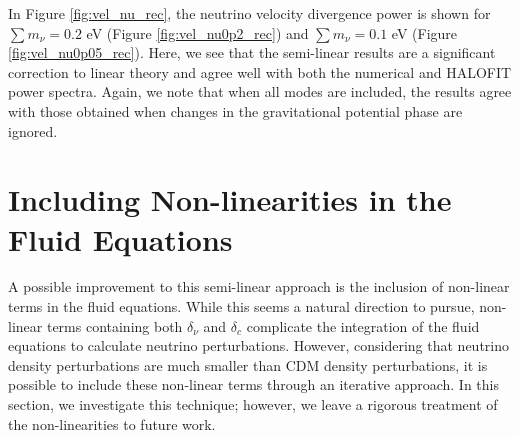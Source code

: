 \documentclass[twocolumn,superscriptaddress,prd]{revtex4}
\newcommand{\halofit}{HALOFIT }
\begin{document}
In Figure \ref{fig:vel_nu_rec}, the neutrino velocity divergence power
is shown 
for $\sum m_\nu = 0.2$ eV (Figure \ref{fig:vel_nu0p2_rec})
and $\sum m_\nu = 0.1$ eV (Figure \ref{fig:vel_nu0p05_rec}). 
Here,
we see that the semi-linear results are a significant correction to
linear theory and agree well with both the numerical and
\halofit power spectra.  
Again, we note that when all modes are
included, the results agree with those obtained
when changes in the gravitational potential phase are ignored.

\section{ Including Non-linearities in the Fluid Equations}
\label{sec:Nonlinear}
A possible improvement to this semi-linear approach 
is the inclusion of non-linear terms in the fluid equations. 
While this seems a natural direction to pursue, 
non-linear terms 
containing both $\delta_\nu$ and $\delta_c$ complicate the
integration of the fluid equations to calculate neutrino perturbations.  However,
considering that neutrino density perturbations are much smaller
than CDM density perturbations, it is possible to include
these non-linear terms through an iterative approach.
In this section, we investigate this technique; %
however, we leave
a rigorous treatment of the non-linearities to future work. 
\end{document}
